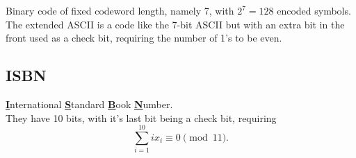 Binary code of fixed codeword length, namely 7, with $2^7 = 128$ encoded symbols. \\

The extended ASCII is a code like the 7-bit ASCII but with an extra bit in the front used as a check bit, requiring the number of 1's to be even.

\subsection{ISBN}
\textbf{\underline{I}}nternational \textbf{\underline{S}}tandard \textbf{\underline{B}}ook \textbf{\underline{N}}umber. \\

They have 10 bits, with it's last bit being a check bit, requiring
\[\sum_{i=1}^{10} i x_i \equiv 0 \pmod{11}.\]

\pagebreak